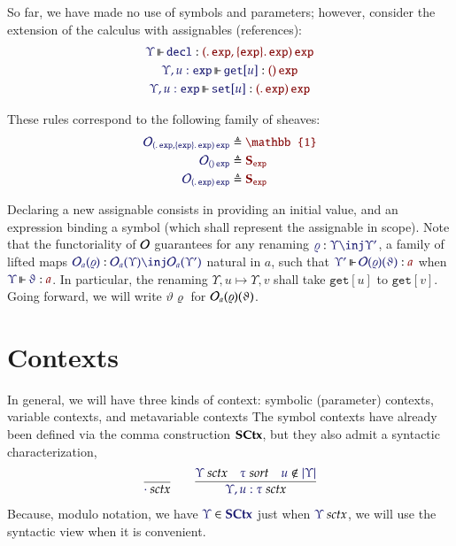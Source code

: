 \documentclass[11pt]{article}
\theoremstyle{definition}
\theoremstyle{remark}
\numberwithin{equation}{section}
\newcommand\SortExp{\mathtt{exp}}
\begin{document}
So far, we have made no use of symbols and parameters; however, consider the
extension of the calculus with assignables (references):
%
\begin{gather*}
  \IsOperator{\Upsilon}{\mathtt{decl}}{
    \MkArity{
      \MkValence{}{}{\SortExp},
      \MkValence{\SortExp}{}{\SortExp}
    }{
      \SortExp
    }
  }
\\
  \IsOperator{\Upsilon,u:\SortExp}{\mathtt{get}[u]}{
    \MkArity{}{\SortExp}
  }
\\
  \IsOperator{\Upsilon,u:\SortExp}{\mathtt{set}[u]}{
    \MkArity{
      \MkValence{}{}{\SortExp}
    }{
      \SortExp
    }
  }
\end{gather*}

These rules correspond to the following family of sheaves:
\begin{align*}
  \ADefine{
    \Operators_{
      \MkArity{
        \MkValence{}{}{\SortExp},
        \MkValence{\SortExp}{}{\SortExp}
      }{
        \SortExp
      }
    }
  }{
    \mathbb{1}
  }\\
  \ADefine{
    \Operators_{
      \MkArity{}{\SortExp}
    }
  }{
    \mathbf{S}_\SortExp
  }\\
  \ADefine{
    \Operators_{
      \MkArity{
        \MkValence{}{}{\SortExp}
      }{
        \SortExp
      }
    }
  }{
    \mathbf{S}_\SortExp
  }
\end{align*}

Declaring a new assignable consists in providing an initial value, and an
expression binding a symbol (which shall represent the assignable in scope).
Note that the functoriality of $\mathcal{O}$ guarantees for any renaming
$\Of{\varrho}{\Upsilon\inj\Upsilon'}$, a family of lifted maps
$\Of{\Operators_a(\varrho)}{\Operators_a(\Upsilon)\inj\Operators_a(\Upsilon')}$
natural in $a$, such that
$\IsOperator{\Upsilon'}{\Operators(\varrho)(\vartheta)}{a}$ when
$\IsOperator{\Upsilon}{\vartheta}{a}$. In particular, the renaming
$\Upsilon,u\mapsto\Upsilon,v$ shall take $\mathtt{get}[u]$ to
$\mathtt{get}[v]$. Going forward, we will write $\vartheta\varrho$ for
$\mathcal{O}_a(\varrho)(\vartheta)$.


\section{Contexts}

In general, we will have three kinds of context: symbolic (parameter) contexts,
variable contexts, and metavariable contexts The symbol contexts have already
been defined via the comma construction $\mathbf{SCtx}$, but they also admit a
syntactic characterization,
\begin{gather*}
  \infer{
    \IsSymCtx{\cdot}
  }{
  }
\qquad
  \infer{
    \IsSymCtx{\Upsilon,u:\tau}
  }{
    \IsSymCtx{\Upsilon}
&
    \IsSort{\tau}
&
    \NotIn{u}{\Dom\Upsilon}
  }
\end{gather*}
%
Because, modulo notation, we have $\Member{\Upsilon}{\SCtx}$ just when
$\IsSymCtx{\Upsilon}$, we will use the syntactic view when it is convenient.
\end{document}
